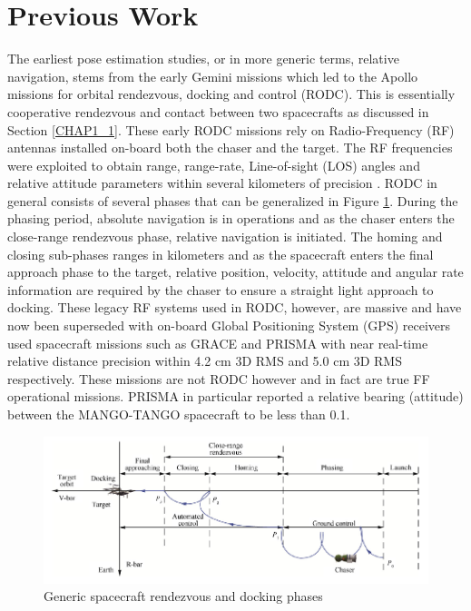 \section{Previous Work}\label{CHAP1_3}
The earliest pose estimation studies, or in more generic terms, relative navigation, stems from the early Gemini missions \cite{chamberlinGemini64} which led to the Apollo missions \cite{youngApollo70} for orbital rendezvous, docking and control (RODC). This is essentially cooperative rendezvous and contact between two spacecrafts as discussed in Section \ref{CHAP1_1}. These early RODC missions rely on Radio-Frequency (RF) antennas installed on-board both the chaser and the target. The RF frequencies were exploited to obtain range, range-rate, Line-of-sight (LOS) angles and relative attitude parameters within several kilometers of precision \cite{fehse_2003, woffidenRez07}. RODC in general consists of  several phases that can be generalized in  Figure \ref{fig:rendezvousPhase}. During the phasing period, absolute navigation is in operations and as the chaser enters the close-range rendezvous phase, relative navigation is initiated. The homing and closing sub-phases ranges in kilometers and as the spacecraft enters the final approach phase to the target, relative position, velocity, attitude and angular rate information are required by the chaser to ensure a  straight light approach to docking. These legacy RF systems used in RODC, however, are massive and have now been superseded with on-board Global Positioning System (GPS) receivers used spacecraft missions such as GRACE \cite{yangInterSatelliteGrace13} and PRISMA \cite{dAmicoPrisma11} with near real-time relative distance precision within 4.2 cm 3D RMS and 5.0 cm 3D RMS respectively. These missions are not RODC however and in fact are true FF operational missions. PRISMA in particular reported \cite{bodinPrisma12} a relative bearing (attitude) between the MANGO-TANGO spacecraft to be less than 0.1\textdegree.
\begin{figure}[ht]
    \centering
    \includegraphics[width=1\textwidth]{Figures/LuoSurveyOfRelativeNavigation.PNG}
    \caption{Generic spacecraft rendezvous and docking phases \cite{luoSurvey13}}
    \label{fig:rendezvousPhase}
\end{figure}


